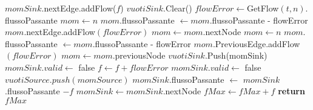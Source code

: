 \documentclass{article}
\begin{document}
\begin{algorithm}
    \begin{algorithmic}
        \STATE $momSink$.nextEdge.addFlow($f$)
        \STATE $vuotiSink.$Clear()
        \STATE $flowError \leftarrow $GetFlow$(t,n).$flussoPassante
        \STATE $mom \leftarrow n$
        \STATE $mom.$flussoPassante $\leftarrow mom.$flussoPassante - flowError
        \STATE $mom.$nextEdge.addFlow$(flowError)$
        \STATE $mom \leftarrow mom.$nextNode
        \ENDWHILE
        \STATE $mom \leftarrow n$
        \STATE $mom.$flussoPassante $\leftarrow mom.$flussoPassante - flowError
        \STATE $mom.$PreviousEdge.addFlow$(flowError)$
        \STATE $mom \leftarrow mom.$previousNode
        \ENDWHILE
        \STATE $vuotiSink.$Push(momSink)
        \STATE $momSink.valid \leftarrow$ false
        \STATE $f \leftarrow f + flowError$
        \STATE $momSink.valid \leftarrow$ false
        \STATE $vuotiSource.push(momSource)$
        \ENDIF
        \STATE $momSink$.flussoPassante $\leftarrow$ $momSink$.flussoPassante $-f$
        \STATE $momSink \leftarrow momSink.$nextNode
        \ENDWHILE
        \STATE $fMax \leftarrow fMax + f$
        \ENDWHILE
        \STATE \textbf{return} $fMax$
    \end{algorithmic}
\end{algorithm}
\end{document}
